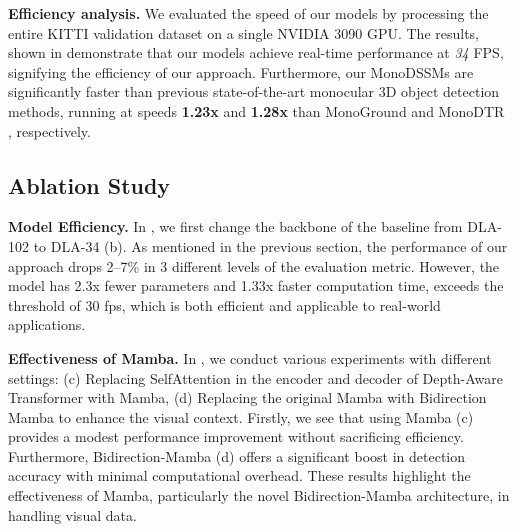 \noindent\textbf{Efficiency analysis.} We evaluated the speed of our models by processing the entire KITTI validation dataset on a single NVIDIA 3090 GPU. The results, shown in  demonstrate that our models achieve real-time performance at \textit{34} FPS, signifying the efficiency of our approach. Furthermore, our MonoDSSMs are significantly faster than previous state-of-the-art monocular 3D object detection methods, running at speeds \textbf{1.23x} and \textbf{1.28x} than MonoGround \cite{MonoGround} and MonoDTR \cite{MonoDTR}, respectively.

\subsection{Ablation Study}
\textbf{Model Efficiency.} In , we first change the backbone of the baseline from DLA-102 \cite{DLA} to DLA-34 (b). As mentioned in the previous section, the performance of our approach drops 2--7\% in 3 different levels of the evaluation metric. However, the model has 2.3x fewer parameters and 1.33x faster computation time, exceeds the threshold of 30 fps, which is both efficient and applicable to real-world applications.

\noindent\textbf{Effectiveness of Mamba.} In , we conduct various experiments with different settings: (c) Replacing SelfAttention in the encoder and decoder of Depth-Aware Transformer \cite{MonoDTR} with Mamba, (d) Replacing the original Mamba with Bidirection Mamba to enhance the visual context. Firstly, we see that using Mamba (c) provides a modest performance improvement without sacrificing efficiency. Furthermore, Bidirection-Mamba (d) offers a significant boost in detection accuracy with minimal computational overhead. These results highlight the effectiveness of Mamba, particularly the novel Bidirection-Mamba architecture, in handling visual data.

